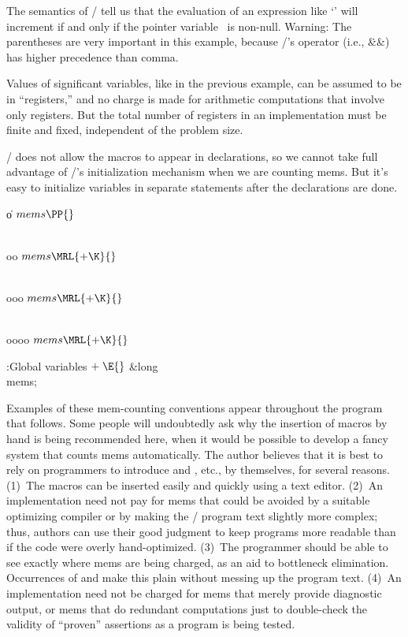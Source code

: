 The semantics of \CEE/ tell us that the evaluation of an expression
like `' will increment  if
and only if the
pointer variable~ is non-null. Warning: The parentheses are very
important in this example, because \CEE/'s operator \PB{$\W$} (i.e.,
\.{\&\&}) has higher precedence than comma.

Values of significant variables, like  in the previous example,
can be assumed to be in ``registers,'' and no charge is made for
arithmetic computations that involve only registers. But the total
number of registers in an implementation must be finite and fixed,
independent of the problem size.

\CEE/ does not allow the  macros to appear in declarations, so we
cannot
take full advantage of \CEE/'s initialization mechanism when we are
counting mems. But it's easy to initialize variables in separate
statements after the declarations are done.

\Y\B\4\D\|o\5
$\\{mems}\PP{}$\par
\B\4\D\\{oo}\5
$\\{mems}\MRL{+{\K}}{}$\par
\B\4\D\\{ooo}\5
$\\{mems}\MRL{+{\K}}{}$\par
\B\4\D\\{oooo}\5
$\\{mems}\MRL{+{\K}}{}$\par
\Y\B\4:Global variables\X${}\mathrel+\E{}$\6
\&{long} \\{mems};\par
\fi

Examples of these mem-counting conventions appear throughout the
program that follows. Some people will undoubtedly ask why the insertion of
macros by hand is being recommended here, when it would be possible to
develop a fancy system that counts mems automatically. The author
believes that it is best to rely on programmers to introduce  and
, etc., by themselves, for several reasons. (1)~The macros can be
inserted easily and quickly using a text editor. (2)~An implementation
need not pay for mems that could be avoided by a suitable optimizing
compiler or by making the \CEE/ program text slightly more complex;
thus, authors can use their good judgment to keep programs more
readable than if the code were overly hand-optimized. (3)~The
programmer should be able to see exactly where mems are being charged,
as an aid to bottleneck elimination. Occurrences of  and 
make
this plain without messing up the program text. (4)~An implementation
need not be charged for mems that merely provide diagnostic output, or
mems that do redundant computations just to double-check the validity
of ``proven'' assertions as a program is being tested.


